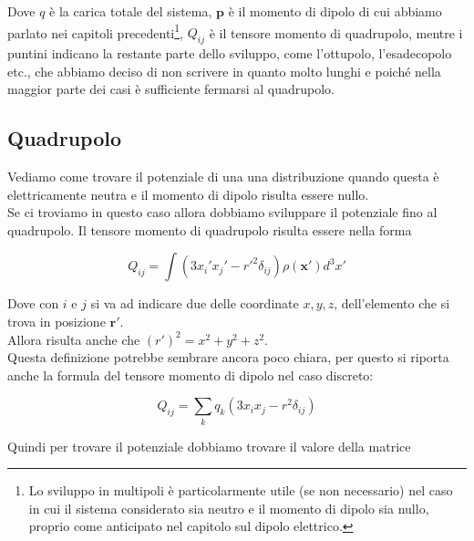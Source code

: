 Dove $q$ è la carica totale del sistema, $\mathbf{p}$ è il momento di dipolo di cui abbiamo parlato nei capitoli precedenti\footnote{Lo sviluppo in multipoli è particolarmente utile (se non necessario) nel caso in cui il sistema considerato sia neutro e il momento di dipolo sia nullo, proprio come anticipato nel capitolo sul dipolo elettrico.}, $Q_{ij}$ è il  tensore momento di quadrupolo, mentre i puntini indicano la restante parte dello sviluppo, come l'ottupolo, l'esadecopolo etc., che abbiamo deciso di non scrivere in quanto molto lunghi e poiché nella maggior parte dei casi è sufficiente fermarsi al quadrupolo. 

\newpage

\subsection{Quadrupolo}

Vediamo come trovare il potenziale di una una distribuzione quando questa è elettricamente neutra e il momento di dipolo risulta essere nullo. \\

Se ci troviamo in questo caso allora dobbiamo sviluppare il potenziale fino al quadrupolo. Il tensore momento di quadrupolo risulta essere nella forma

\begin{tcolorbox}[colback=yellow!10!white, colframe=orange!70!black, boxrule=0.8pt]
\begin{equation} \label{eq:tensore_quadrupolo}
    Q_{ij} = \int (3x_i' x_j ' - r'^2 \delta_{ij}) \rho (\mathbf{x'}) d^3 x'
\end{equation}
\end{tcolorbox}

Dove con $i$ e $j$ si va ad indicare due delle coordinate $x,y,z$, dell'elemento che si trova in posizione $\mathbf{r'}$. \\
Allora risulta anche che ${(r')^2} = x^2 + y^2 + z^2$.  \\

Questa definizione potrebbe sembrare ancora poco chiara, per questo si riporta anche la formula del tensore momento di dipolo nel caso discreto:

\begin{equation}
    Q_{ij} = \sum_k q_k (3x_i x_j - r^2 \delta_{ij})
\end{equation}

Quindi per trovare il potenziale dobbiamo trovare il valore della matrice 

